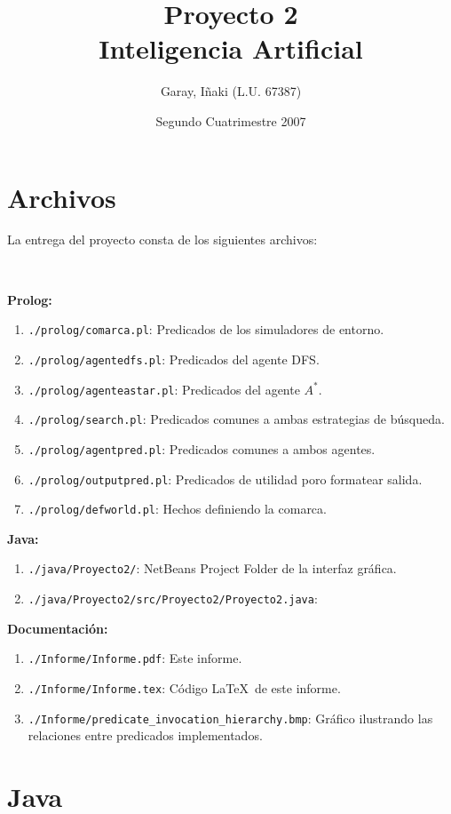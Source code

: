 \documentclass[a4paper,12pt]{report}
\title{Proyecto 2 \\ Inteligencia Artificial}
\author{Garay, I\~{n}aki (L.U. 67387)}
\date{Segundo Cuatrimestre 2007}
\begin{document}
\maketitle
\tableofcontents

\chapter{Archivos}
La entrega del proyecto consta de los siguientes archivos:

\

\textbf{Prolog:}
\begin{enumerate}
\item \texttt{./prolog/comarca.pl}: Predicados de los simuladores de entorno.
\item \texttt{./prolog/agentedfs.pl}: Predicados del agente DFS.
\item \texttt{./prolog/agenteastar.pl}: Predicados del agente $A^{*}$.
\item \texttt{./prolog/search.pl}: Predicados comunes a ambas estrategias de b\'{u}squeda.
\item \texttt{./prolog/agentpred.pl}: Predicados comunes a ambos agentes.
\item \texttt{./prolog/outputpred.pl}: Predicados de utilidad poro formatear salida.
\item \texttt{./prolog/defworld.pl}: Hechos definiendo la comarca.
\end{enumerate}

\textbf{Java:}
\begin{enumerate}
\item \texttt{./java/Proyecto2/}: NetBeans Project Folder de la interfaz gr\'{a}fica.
\item \texttt{./java/Proyecto2/src/Proyecto2/Proyecto2.java}:
\end{enumerate}

\textbf{Documentaci\'{o}n:}
\begin{enumerate}
\item \texttt{./Informe/Informe.pdf}: Este informe.
\item \texttt{./Informe/Informe.tex}: C\'{o}digo \LaTeX\ de este informe.
\item \texttt{./Informe/predicate\_invocation\_hierarchy.bmp}: Gr\'{a}fico ilustrando las relaciones entre predicados
implementados.
\end{enumerate}

\chapter{Java}
\end{document}
